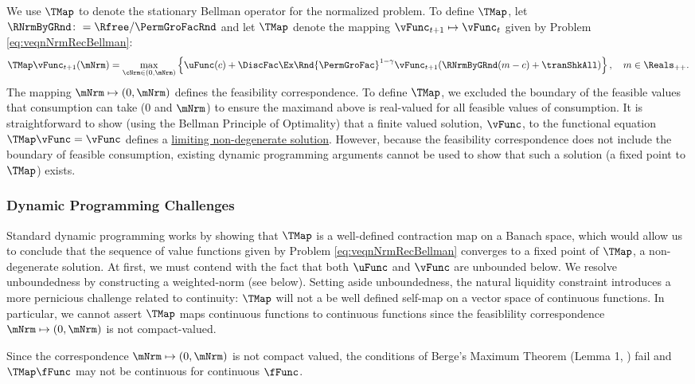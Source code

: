 \documentclass[BufferStockTheory]{subfiles}
\begin{document}
We use $\TMap$ to denote the stationary Bellman operator for the normalized problem.
To define $\TMap$, let $\RNrmByGRnd \colon = \Rfree/\PermGroFacRnd$ and let $\TMap$ denote the mapping $\vFunc_{t+1} \mapsto \vFunc_{t}$ given by Problem \ref{eq:veqnNrmRecBellman}:
%
\begin{equation}\label{eq:maintmap}
  \TMap \vFunc_{t+1}(\mNrm) = \max_{\cNrm \in (0, \mNrm) }  \left\{
    \uFunc(c) + \DiscFac\Ex\Rnd{\PermGroFac}^{1-\CRRA}\vFunc_{t+1}(\RNrmByGRnd(m - c) + \tranShkAll)
  \right\}, \quad m \in \Reals_{++}.  
\end{equation}
%
The mapping $\mNrm\mapsto (0, \mNrm)$ defines the feasibility correspondence.
To define $\TMap$, we excluded the boundary of the feasible values that consumption can take ($0$ and $\mNrm$) to ensure the maximand above is real-valued for all feasible values of consumption.
It is straightforward to show (using the Bellman Principle of Optimality) that a finite valued solution, $\vFunc$, to the functional equation $\TMap\vFunc = \vFunc$ defines a \hyperlink{sensible}{limiting non-degenerate solution}.
However, because the feasibility correspondence does not include the boundary of feasible consumption, existing dynamic programming arguments cannot be used to show that such a solution (a fixed point to $\TMap$) exists.


\subsubsection{Dynamic Programming Challenges}\label{subsubsec:challengesDP} \hypertarget{challengesDP}{} Standard dynamic programming \citep{stachurski2022} works by showing that $\TMap$ is a well-defined contraction map on a Banach space, which would allow us to conclude that the sequence of value functions given by Problem \ref{eq:veqnNrmRecBellman} converges to a fixed point of $\TMap$, a non-degenerate solution.
At first, we must contend with the fact that both $\uFunc$ and $\vFunc$ are unbounded below.
We resolve unboundedness by constructing a weighted-norm (see below).
Setting aside unboundedness, the natural liquidity constraint introduces a more pernicious challenge related to continuity: $\TMap$ will not a be well defined self-map on a vector space of continuous functions.
In particular, we cannot assert $\TMap$ maps continuous functions to continuous functions since the feasiblility correspondence $\mNrm\mapsto (0, \mNrm)$ is not compact-valued.

\begin{remark}\label{remark:notCompact}
Since the correspondence $\mNrm\mapsto (0, \mNrm)$ is not compact valued, the conditions of Berge's Maximum Theorem (Lemma 1, \cite{Jaskiewicz2011}) fail and $\TMap \fFunc$ may not be continuous for continuous $\fFunc$.
\end{remark}
\end{document}
